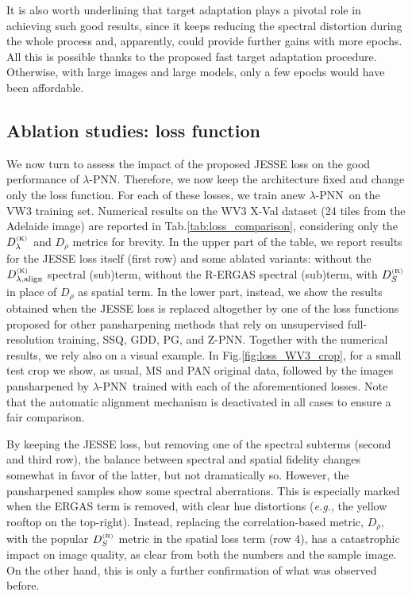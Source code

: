 \documentclass[journal]{IEEEtran}
\newcommand{\DL} {D^{_{\rm (K)}}_\lambda}
\newcommand{\DLa}{D^{_{\rm (K)}}_{\lambda, \rm align}}
\newcommand{\DR} {D_{\rho}}
\newcommand{\DSR}{D^{_{\rm (R)}}_S}
\newcommand{\LPNN}  {$\lambda$-PNN}
\begin{document}
It is also worth underlining that target adaptation plays a pivotal role in achieving such good results,
since it keeps reducing the spectral distortion during the whole process and, apparently, could provide further gains with more epochs.
All this is possible thanks to the proposed fast target adaptation procedure.
Otherwise, with large images and large models, only a few epochs would have been affordable.

\subsection{Ablation studies: loss function}

We now turn to assess the impact of the proposed JESSE loss on the good performance of \LPNN.
Therefore, we now keep the architecture fixed and change only the loss function.
For each of these losses, we train anew \LPNN\ on the VW3 training set.
Numerical results on the WV3 X-Val dataset (24 tiles from the Adelaide image) are reported in Tab.\ref{tab:loss_comparison},
considering only the $\DL$ and $\DR$ metrics for brevity.
In the upper part of the table, we report results for the JESSE loss itself (first row) and some ablated variants:
without the $\DLa$ spectral (sub)term, without the R-ERGAS spectral (sub)term, with $\DSR$ in place of $\DR$ as spatial term.
In the lower part, instead, we show the results obtained
when the JESSE loss is replaced altogether by one of the loss functions proposed for other pansharpening methods that rely on unsupervised full-resolution training,
SSQ, GDD, PG, and Z-PNN.
Together with the numerical results, we rely also on a visual example.
In Fig.\ref{fig:loss_WV3_crop}, for a small test crop we show, as usual, MS and PAN original data,
followed by the images pansharpened by \LPNN\ trained with each of the aforementioned losses.
Note that the automatic alignment mechanism is deactivated in all cases to ensure a fair comparison.

By keeping the JESSE loss, but removing one of the spectral subterms (second and third row),
the balance between spectral and spatial fidelity changes somewhat in favor of the latter, but not dramatically so.
However, the pansharpened samples show some spectral aberrations.
This is especially marked when the ERGAS term is removed, with clear hue distortions ({\it e.g.}, the yellow rooftop on the top-right).
Instead, replacing the correlation-based metric, $\DR$, with the popular $\DSR$ metric in the spatial loss term (row 4),
has a catastrophic impact on image quality, as clear from both the numbers and the sample image.
On the other hand, this is only a further confirmation of what was observed before.
\end{document}
